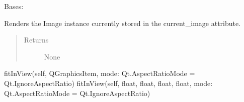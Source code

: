 \documentclass[letterpaper,10pt,english]{sphinxmanual}
\begin{document}
\begin{fulllineitems}
\label{\detokenize{polo.widgets:polo.widgets.slideshow_viewer.PhotoViewer}}
Bases: 

\begin{fulllineitems}
\label{\detokenize{polo.widgets:polo.widgets.slideshow_viewer.PhotoViewer.display_current_image}}
Renders the Image instance currently stored in the current\_image            attribute.
\begin{quote}\begin{description}
\item[{Returns}] \leavevmode
None

\end{description}\end{quote}

\end{fulllineitems}


\begin{fulllineitems}
\label{\detokenize{polo.widgets:polo.widgets.slideshow_viewer.PhotoViewer.fitInView}}
fitInView(self, QGraphicsItem, mode: Qt.AspectRatioMode = Qt.IgnoreAspectRatio)
fitInView(self, float, float, float, float, mode: Qt.AspectRatioMode = Qt.IgnoreAspectRatio)

\end{fulllineitems}


\begin{fulllineitems}
\label{\detokenize{polo.widgets:polo.widgets.slideshow_viewer.PhotoViewer.hasPhoto}}
\end{fulllineitems}


\end{fulllineitems}
\end{document}

